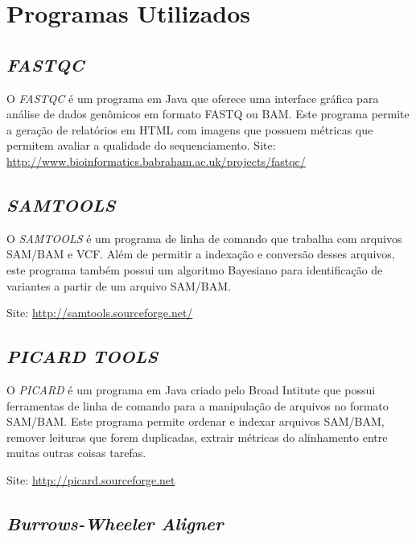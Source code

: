 % 

\section{Programas Utilizados}

\subsection{\textit{FASTQC}}

O \textit{FASTQC} é um programa em Java que oferece uma interface gráfica para análise de dados genômicos em formato FASTQ ou BAM. Este programa permite a geração de relatórios em HTML com imagens que possuem métricas que permitem avaliar a qualidade do sequenciamento.
\noindent
Site: \url{http://www.bioinformatics.babraham.ac.uk/projects/fastqc/}


\subsection{\textit{SAMTOOLS}}

O \textit{SAMTOOLS} é um programa de linha de comando que trabalha com arquivos SAM/BAM e VCF. Além de permitir a indexação e conversão desses arquivos, este programa também possui um algoritmo Bayesiano para identificação de variantes a partir de um arquivo SAM/BAM.

\noindent
Site: \url{http://samtools.sourceforge.net/}


\subsection{\textit{PICARD TOOLS}}

O \textit{PICARD} é um programa em Java criado pelo Broad Intitute que possui ferramentas de linha de comando para a manipulação de arquivos no formato SAM/BAM. Este programa permite ordenar e indexar arquivos SAM/BAM, remover leituras que forem duplicadas, extrair métricas do alinhamento entre muitas outras coisas tarefas.

\noindent
Site: \url{http://picard.sourceforge.net}

\subsection{\textit{Burrows-Wheeler Aligner}}

